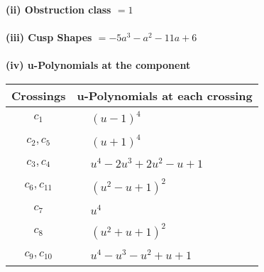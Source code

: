 \documentclass[1p]{elsarticle_modified}
\theoremstyle{definition}
\begin{document}
\flushleft \textbf{(ii) Obstruction class $= 1$}\\~\\
\flushleft \textbf{(iii) Cusp Shapes $= -5 a^3- a^2-11 a+6$}\\~\\
\newpage\renewcommand{\arraystretch}{1}
\flushleft \textbf{(iv) u-Polynomials at the component}\newline \\
\begin{tabular}{m{50pt}|m{274pt}}
Crossings & \hspace{64pt}u-Polynomials at each crossing \\
\hline $$\begin{aligned}c_{1}\end{aligned}$$&$\begin{aligned}
&(u-1)^4
\end{aligned}$\\
\hline $$\begin{aligned}c_{2},c_{5}\end{aligned}$$&$\begin{aligned}
&(u+1)^4
\end{aligned}$\\
\hline $$\begin{aligned}c_{3},c_{4}\end{aligned}$$&$\begin{aligned}
&u^4-2 u^3+2 u^2- u+1
\end{aligned}$\\
\hline $$\begin{aligned}c_{6},c_{11}\end{aligned}$$&$\begin{aligned}
&(u^2- u+1)^2
\end{aligned}$\\
\hline $$\begin{aligned}c_{7}\end{aligned}$$&$\begin{aligned}
&u^4
\end{aligned}$\\
\hline $$\begin{aligned}c_{8}\end{aligned}$$&$\begin{aligned}
&(u^2+u+1)^2
\end{aligned}$\\
\hline $$\begin{aligned}c_{9},c_{10}\end{aligned}$$&$\begin{aligned}
&u^4- u^3- u^2+u+1
\end{aligned}$\\
\hline
\end{tabular}\\~\\
\end{document}
